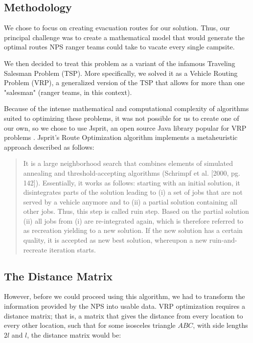 \documentclass[12pt]{article}
\begin{document}
\subsection{Methodology}
We chose to focus on creating evacuation routes for our solution. Thus, our principal challenge was to create a mathematical model that would generate the optimal routes NPS ranger teams could take to vacate every single campsite.

We then decided to treat this problem as a variant of the infamous Traveling Salesman Problem (TSP). More specifically, we solved it as a Vehicle Routing Problem (VRP), a generalized version of the TSP that allows for more than one "salesman" (ranger teams, in this context).

Because of the intense mathematical and computational complexity of algorithms suited to optimizing these problems, it was not possible for us to create one of our own, so we chose to use Jsprit, an open source Java library popular for VRP problems \cite{jspritGithub}. Jsprit's Route Optimization algorithm implements a metaheuristic approach described as follows:
\begin{quote}
    It is a large neighborhood search that combines elements of simulated annealing and threshold-accepting algorithms (Schrimpf et al. [2000, pg. 142]). Essentially, it works as follows: starting with an initial solution, it disintegrates parts of the solution leading to (i) a set of jobs that are not served by a vehicle anymore and to (ii) a partial solution containing all other jobs. Thus, this step is called ruin step. Based on the partial solution (ii) all jobs from (i) are re-integrated again, which is therefore referred to as recreation yielding to a new solution. If the new solution has a certain quality, it is accepted as new best solution, whereupon a new ruin-and-recreate iteration starts. \cite{metaheuristicExplanation}
\end{quote}

\subsection{The Distance Matrix}

However, before we could proceed using this algorithm, we had to transform the information provided by the NPS into usable data. VRP optimization requires a distance matrix; that is, a matrix that gives the distance from every location to every other location, such that for some isosceles triangle $ABC$, with side lengths $2l$ and $l$, the distance matrix would be:
\end{document}
